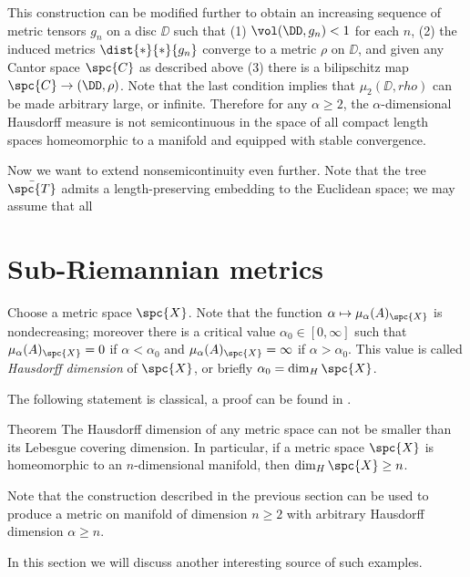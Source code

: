 This construction can be modified further to obtain an increasing sequence of metric tensors $g_n$ on a disc $\DD$ such that (1) $\vol(\DD,g_n)<1$ for each $n$, (2) the induced metrics $\dist{*}{*}{g_n}$ converge to a metric $\rho$ on $\DD$, and given any Cantor space $\spc{C}$ as described above (3) there is a bilipschitz map $\spc{C}\to(\DD,\rho)$.
Note that the last condition implies that $\mu_2(\DD,rho)$ can be made arbitrary large, or infinite.
Therefore for any $\alpha\ge 2$, the $\alpha$-dimensional Hausdorff measure is not semicontinuous in the space of all compact length spaces homeomorphic to a manifold and equipped with stable convergence.

Now we want to extend nonsemicontinuity even further.
Note that the tree $\bar{\spc{T}}$ admits a length-preserving embedding to the Euclidean space; we may assume that all 



\section{Sub-Riemannian metrics}

Choose a metric space $\spc{X}$.
Note that the function $\alpha\mapsto \mu_\alpha(A)_\spc{X}$ is nondecreasing;
moreover there is a critical value $\alpha_0\in[0,\infty]$ such that $\mu_\alpha(A)_\spc{X}=0$ if $\alpha<\alpha_0$ and $\mu_\alpha(A)_\spc{X}=\infty$ if $\alpha>\alpha_0$.
This value is called \emph{Hausdorff dimension} of $\spc{X}$, or briefly $\alpha_0=\dim_H\spc{X}$.

The following statement is classical, a proof can be found in .

\begin{thm}{Theorem}
The Hausdorff dimension of any metric space can not be smaller than its Lebesgue covering dimension.
In particular, if a metric space $\spc{X}$ is homeomorphic to an $n$-dimensional manifold, then $\dim_H\spc{X}\ge n$.
 
\end{thm}

Note that the construction described in the previous section can be used to produce a metric on manifold of dimension $n\ge 2$ with arbitrary Hausdorff dimension $\alpha\ge n$.

In this section we will discuss another interesting source of such examples.


